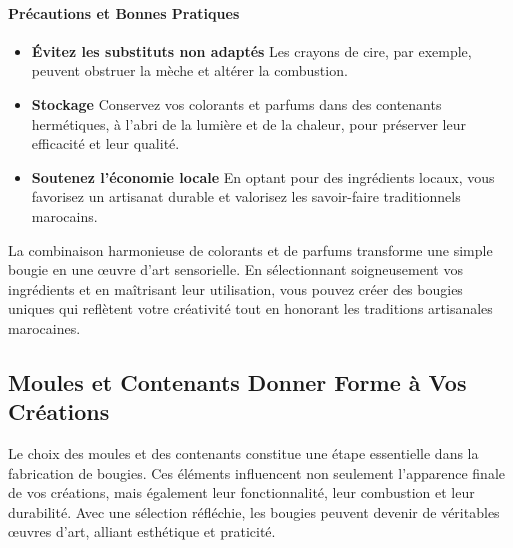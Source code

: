 \documentclass[11pt,fleqn,onecolumn,oneside]{book}
\begin{document}
\paragraph{Précautions et Bonnes Pratiques}
\begin{itemize}
    \item \textbf{Évitez les substituts non adaptés} Les crayons de cire, par exemple, peuvent obstruer la mèche et altérer la combustion.
    \item \textbf{Stockage} Conservez vos colorants et parfums dans des contenants hermétiques, à l’abri de la lumière et de la chaleur, pour préserver leur efficacité et leur qualité.
    \item \textbf{Soutenez l’économie locale} En optant pour des ingrédients locaux, vous favorisez un artisanat durable et valorisez les savoir-faire traditionnels marocains.
\end{itemize}

\begin{corollary}
La combinaison harmonieuse de colorants et de parfums transforme une simple bougie en une œuvre d’art sensorielle. En sélectionnant soigneusement vos ingrédients et en maîtrisant leur utilisation, vous pouvez créer des bougies uniques qui reflètent votre créativité tout en honorant les traditions artisanales marocaines.
\end{corollary}

\subsection*{Moules et Contenants Donner Forme à Vos Créations}

\begin{definition}
Le choix des moules et des contenants constitue une étape essentielle dans la fabrication de bougies. Ces éléments influencent non seulement l’apparence finale de vos créations, mais également leur fonctionnalité, leur combustion et leur durabilité. Avec une sélection réfléchie, les bougies peuvent devenir de véritables œuvres d’art, alliant esthétique et praticité.
\end{definition}
\end{document}

